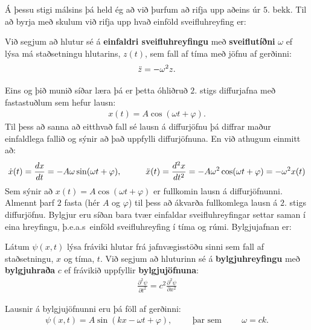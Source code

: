 Á þessu stigi málsins þá held ég að við þurfum að rifja upp aðeins úr $5.$ bekk. Til að byrja með skulum við rifja upp hvað einföld sveifluhreyfing er:

\begin{tcolorbox}
\begin{definition}
Við segjum að hlutur sé á \textbf{einfaldri sveifluhreyfingu} með \textbf{sveiflutíðni} $\omega$ ef lýsa má staðsetningu hlutarins, $z(t)$, sem fall af tíma með jöfnu af gerðinni:
\begin{align*}
    \Ddot{z} = - \omega^2z.
\end{align*}
\end{definition}
\end{tcolorbox}
Eins og þið munið síðar læra þá er þetta óhliðruð $2.$ stigs diffurjafna með fastastuðlum sem hefur lausn:
\begin{align*}
    x(t) = A\cos(\omega t + \varphi).
\end{align*}
Til þess að sanna að eitthvað fall sé lausn á diffurjöfnu þá diffrar maður einfaldlega fallið og sýnir að það uppfylli diffurjöfnuna. En við athugum einmitt að:
\begin{align*}
    \Dot{x}(t) =  \frac{dx}{dt} = -A\omega\sin(\omega t + \varphi), \hspace{1cm} \Ddot{x}(t) = \frac{d^2x}{dt^2} = -A\omega^2 \cos(\omega t + \varphi) = -\omega^2x(t)
\end{align*}
Sem sýnir að $x(t) = A\cos(\omega t + \varphi)$ er fullkomin lausn á diffurjöfnunni. Almennt þarf $2$ fasta (hér $A$ og $\varphi$) til þess að ákvarða fullkomlega lausn á $2.$ stigs diffurjöfnu. Bylgjur eru síðan bara tvær einfaldar sveifluhreyfingar settar saman í eina hreyfingu, þ.e.a.s~einföld sveifluhreyfing í tíma og rúmi. Bylgjujafnan er:
\begin{tcolorbox}
\begin{definition}
Látum $\psi(x,t)$ lýsa fráviki hlutar frá jafnvægisstöðu sinni sem fall af staðsetningu, $x$ og tíma, $t$. Við segjum að hluturinn sé á \textbf{bylgjuhreyfingu} með \textbf{bylgjuhraða} $c$ ef frávikið uppfyllir \textbf{bylgjujöfnuna}:
\begin{align*}
    \frac{\partial^2\psi}{\partial t^2} = c^2 \frac{\partial^2 \psi}{\partial x^2}
\end{align*}
\end{definition}
\end{tcolorbox}
Lausnir á bylgjujöfnunni eru þá föll af gerðinni:
\begin{align*}
    \psi(x,t) = A\sin(kx - \omega t + \varphi), \hspace{1cm} \text{þar sem} \hspace{1cm} \omega =  ck.
\end{align*}
